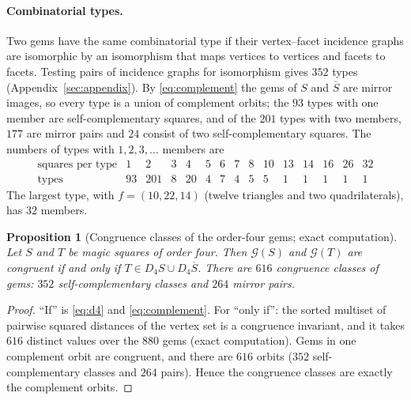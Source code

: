 \documentclass[11pt,a4paper]{article}
\theoremstyle{plain}
\newtheorem{proposition}[theorem]{Proposition}
\theoremstyle{definition}
\theoremstyle{remark}
\begin{document}
\paragraph{Combinatorial types.}
Two gems have the same combinatorial type if their vertex--facet incidence graphs are isomorphic by an isomorphism that maps vertices to vertices and facets to facets.
Testing pairs of incidence graphs for isomorphism gives $352$ types (Appendix~\ref{sec:appendix}).
By \eqref{eq:complement} the gems of $S$ and $\overline S$ are mirror images, so every type is a union of complement orbits; the $93$ types with one member are self-complementary squares, and of the $201$ types with two members, $177$ are mirror pairs and $24$ consist of two self-complementary squares.
The numbers of types with $1,2,3,\dots$ members are
\[
\begin{array}{r|rrrrrrrrrrrrrr}
\text{squares per type} & 1&2&3&4&5&6&7&8&10&13&14&16&26&32\\\hline
\text{types} & 93&201&8&20&4&7&4&5&5&1&1&1&1&1
\end{array}
\]
The largest type, with $f=(10,22,14)$ (twelve triangles and two quadrilaterals), has $32$ members.

\begin{proposition}[Congruence classes of the order-four gems; exact computation]
\label{prop:congruence}
Let $S$ and $T$ be magic squares of order four. Then $\mathcal G(S)$ and $\mathcal G(T)$ are congruent if and only if $T\in D_4S\cup D_4\overline S$. There are $616$ congruence classes of gems: $352$ self-complementary classes and $264$ mirror pairs.
\end{proposition}

\begin{proof}
``If'' is \eqref{eq:d4} and \eqref{eq:complement}. For ``only if'': the sorted multiset of pairwise squared distances of the vertex set is a congruence invariant, and it takes $616$ distinct values over the $880$ gems (exact computation). Gems in one complement orbit are congruent, and there are $616$ orbits ($352$ self-complementary classes and $264$ pairs). Hence the congruence classes are exactly the complement orbits.
\end{proof}
\end{document}
